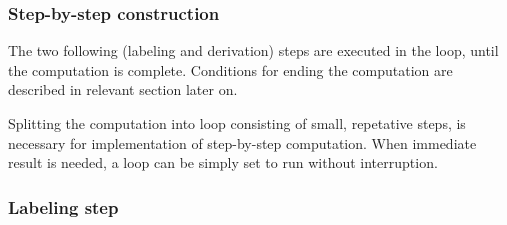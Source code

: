 \documentclass{article}
\begin{document}
\subsubsection{Step-by-step construction}

The two following (labeling and derivation) steps are executed in the loop, until the computation is
complete. Conditions for ending the computation are described in relevant section later on.

Splitting the computation into loop consisting of small, repetative steps, is necessary for
implementation of step-by-step computation. When immediate result is needed, a loop can be simply
set to run without interruption.

\subsubsection*{Labeling step}
\end{document}

